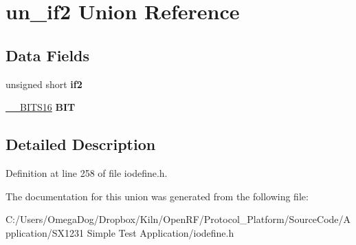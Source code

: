 \hypertarget{unionun__if2}{\section{un\-\_\-if2 Union Reference}
\label{unionun__if2}
}
\subsection*{Data Fields}
\begin{DoxyCompactItemize}
\item 
\hypertarget{unionun__if2_aeafe26469f2aaab2c38aea15d41ab582}{unsigned short {\bfseries if2}}\label{unionun__if2_aeafe26469f2aaab2c38aea15d41ab582}

\item 
\hypertarget{unionun__if2_a126f1a5bad9ef74bce8a7b7480ffad5f}{\hyperlink{struct_____b_i_t_s16}{\-\_\-\-\_\-\-B\-I\-T\-S16} {\bfseries B\-I\-T}}\label{unionun__if2_a126f1a5bad9ef74bce8a7b7480ffad5f}

\end{DoxyCompactItemize}


\subsection{Detailed Description}


Definition at line 258 of file iodefine.\-h.



The documentation for this union was generated from the following file\-:\begin{DoxyCompactItemize}
\item 
C\-:/\-Users/\-Omega\-Dog/\-Dropbox/\-Kiln/\-Open\-R\-F/\-Protocol\-\_\-\-Platform/\-Source\-Code/\-Application/\-S\-X1231 Simple Test Application/iodefine.\-h\end{DoxyCompactItemize}

